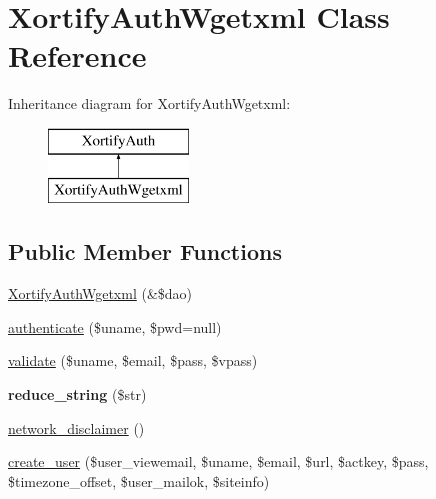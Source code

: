 \hypertarget{class_xortify_auth_wgetxml}{\section{Xortify\-Auth\-Wgetxml Class Reference}
\label{class_xortify_auth_wgetxml}
}
Inheritance diagram for Xortify\-Auth\-Wgetxml\-:\begin{figure}[H]
\begin{center}
\leavevmode
\includegraphics[height=2.000000cm]{class_xortify_auth_wgetxml}
\end{center}
\end{figure}
\subsection*{Public Member Functions}
\begin{DoxyCompactItemize}
\item 
\hyperlink{class_xortify_auth_wgetxml_abcf5d1d82a5cdfdf323f7b3bca8c4c7e}{Xortify\-Auth\-Wgetxml} (\&\$dao)
\item 
\hyperlink{class_xortify_auth_wgetxml_a200ea93c9e4395d3793558f106ac57a0}{authenticate} (\$uname, \$pwd=null)
\item 
\hyperlink{class_xortify_auth_wgetxml_a8aebeefd8bdf9bbcbe87f392387e4b33}{validate} (\$uname, \$email, \$pass, \$vpass)
\item 
\hypertarget{class_xortify_auth_wgetxml_ae40907b6406fbd252546778eaaf13646}{{\bfseries reduce\-\_\-string} (\$str)}\label{class_xortify_auth_wgetxml_ae40907b6406fbd252546778eaaf13646}

\item 
\hyperlink{class_xortify_auth_wgetxml_a2081d022f85d51307e502057f17a6275}{network\-\_\-disclaimer} ()
\item 
\hyperlink{class_xortify_auth_wgetxml_a43cedf10717b84f5219ca43838bb7e53}{create\-\_\-user} (\$user\-\_\-viewemail, \$uname, \$email, \$url, \$actkey, \$pass, \$timezone\-\_\-offset, \$user\-\_\-mailok, \$siteinfo)
\end{DoxyCompactItemize}
